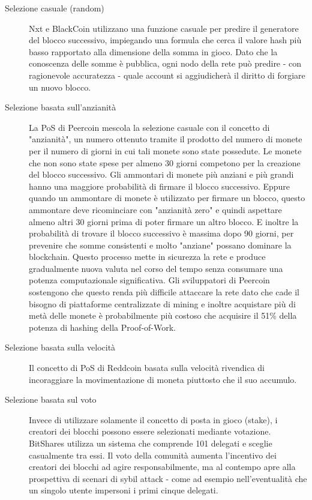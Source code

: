 \begin{description}
  \item[Selezione casuale (random)] Nxt e BlackCoin utilizzano una funzione casuale per predire il generatore del blocco successivo, impiegando una formula che cerca il valore hash più basso rapportato alla dimensione della somma in gioco. Dato che la conoscenza delle somme è pubblica, ogni nodo della rete può predire - con ragionevole accuratezza - quale account si aggiudicherà il diritto di forgiare un nuovo blocco.
  \item[Selezione basata sull'anzianità] La PoS di Peercoin mescola la selezione casuale con il concetto di "anzianità", un numero ottenuto tramite il prodotto del numero di monete per il numero di giorni in cui tali monete sono state possedute. Le monete che non sono state spese per almeno 30 giorni competono per la creazione del blocco successivo. Gli ammontari di monete più anziani e più grandi hanno una maggiore probabilità di firmare il blocco successivo. Eppure quando un ammontare di monete è utilizzato per firmare un blocco, questo ammontare deve ricominciare con "anzianità zero" e quindi aspettare almeno altri 30 giorni prima di poter firmare un altro blocco. E inoltre la probabilità di trovare il blocco successivo è massima dopo 90 giorni, per prevenire che somme consistenti e molto "anziane" possano dominare la blockchain. Questo processo mette in sicurezza la rete e produce gradualmente nuova valuta nel corso del tempo senza consumare una potenza computazionale significativa. Gli sviluppatori di Peercoin sostengono che questo renda più difficile attaccare la rete dato che cade il bisogno di piattaforme centralizzate di mining e inoltre acquistare più di metà delle monete è probabilmente più costoso che acquisire il 51\% della potenza di hashing della Proof-of-Work.
  \item[Selezione basata sulla velocità] Il concetto di PoS di Reddcoin basata sulla velocità rivendica di incoraggiare la movimentazione di moneta piuttosto che il suo accumulo.
  \item[Selezione basata sul voto] Invece di utilizzare solamente il concetto di posta in gioco (stake), i creatori dei blocchi possono essere selezionati mediante votazione. BitShares utilizza un sistema che comprende 101 delegati e sceglie casualmente tra essi. Il voto della comunità aumenta l'incentivo dei creatori dei blocchi ad agire responsabilmente, ma al contempo apre alla prospettiva di scenari di sybil attack - come ad esempio nell'eventualità che un singolo utente impersoni i primi cinque delegati. 
\end{description}

